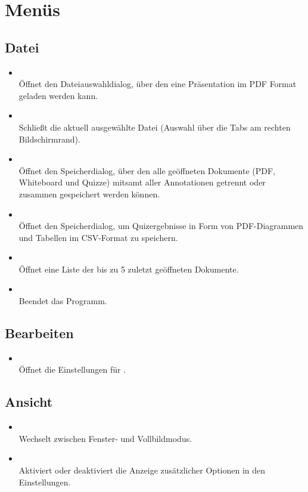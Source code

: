 \section{Menüs}
\subsection{Datei}
\begin{itemize}
\item {}\\Öffnet den Dateiauswahldialog, über den eine Präsentation im PDF Format geladen werden kann.
\item {}\\Schließt die aktuell ausgewählte Datei (Auswahl über die Tabs am rechten Bildschirmrand).
\item {}\\Öffnet den Speicherdialog, über den alle geöffneten Dokumente (PDF, Whiteboard und Quizze) mitsamt aller Annotationen getrennt oder zusammen gespeichert werden können.
\item {}\\Öffnet den Speicherdialog, um Quizergebnisse in Form von PDF-Diagrammen und Tabellen im CSV-Format zu speichern.
\item {}\\Öffnet eine Liste der bis zu 5 zuletzt geöffneten Dokumente.
\item {}\\Beendet das Programm.
\end{itemize}
\subsection{Bearbeiten}
\begin{itemize}
\item {}\\Öffnet die Einstellungen für \lectPresenter{}.
\end{itemize}
\subsection{Ansicht}
\begin{itemize}
\item {}\\Wechselt zwischen Fenster- und Vollbildmodus.
\item {}\\Aktiviert oder deaktiviert die Anzeige zusätzlicher Optionen in den Einstellungen.
\end{itemize}
